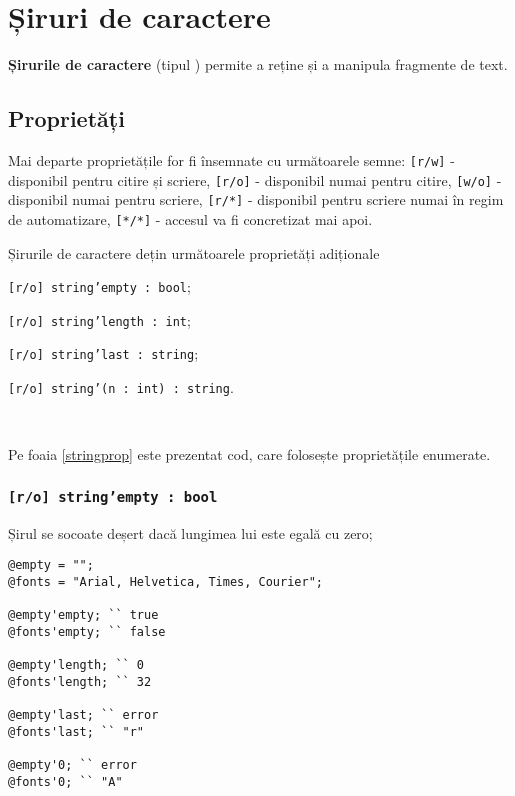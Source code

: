\section{Șiruri de caractere}

{\bf Șirurile de caractere} (tipul \str{}) permite a reține și a manipula fragmente de text. 

\subsection{Proprietăți}

Mai departe proprietățile for fi însemnate cu următoarele semne: \texttt{[r/w]} - disponibil pentru citire și scriere, \texttt{[r/o]} - disponibil numai pentru citire, \texttt{[w/o]} - disponibil numai pentru scriere,  \texttt{[r/*]} - disponibil pentru scriere numai în regim de automatizare, \texttt{[*/*]} - accesul va fi concretizat mai apoi.

Șirurile de caractere dețin următoarele proprietăți adiționale
\begin{icItems}
\item
	\texttt{[r/o] string'empty : bool};
\item
	\texttt{[r/o] string'length : int};
\item
	\texttt{[r/o] string'last : string};
\item
	\texttt{[r/o] string'(n : int) : string}.
\end{icItems}

\

Pe foaia \ref{stringprop} este prezentat cod, care folosește proprietățile enumerate.

\subsubsection{\texttt{[r/o] string'empty : bool}}

Șirul se socoate deșert dacă lungimea lui este egală cu zero;

\begin{sourcecode}
\label{stringprop}
\begin{verbatim}
@empty = "";
@fonts = "Arial, Helvetica, Times, Courier";

@empty'empty; `` true
@fonts'empty; `` false

@empty'length; `` 0
@fonts'length; `` 32

@empty'last; `` error
@fonts'last; `` "r"

@empty'0; `` error
@fonts'0; `` "A"
\end{verbatim}
\end{sourcecode}

